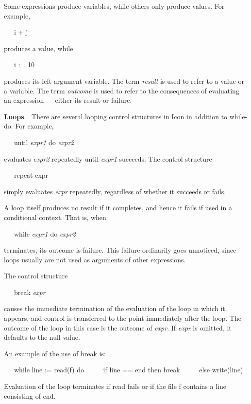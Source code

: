 Some expressions produce variables, while others only produce
values. For example,

{\ttfamily\mdseries
\ \ \ i + j}

\noindent produces a value, while

{\ttfamily\mdseries
\ \ \ i := 10}

\noindent produces its left-argument variable. The term
\textit{result} is used to refer to a value or a variable. The term
\textit{outcome }is used to refer to the consequences of evaluating an
expression --- either its result or failure.

\textbf{Loops}. \ There are several looping control structures in Icon in addition to while-do. For example,

{\ttfamily\mdseries
\ \ \ until \textit{expr1 }do \textit{expr2}}

\noindent evaluates \textit{expr2} repeatedly until \textit{expr1}
succeeds. The control structure

{\ttfamily\mdseries
\ \ \ repeat expr}

\noindent simply evaluates \textit{expr} repeatedly, regardless of
whether it succeeds or fails.

A loop itself produces no result if it completes, and hence it fails
if used in a conditional context. That is, when

{\ttfamily\mdseries
\ \ \ while \textit{expr1 }do \textit{expr2}}

\noindent terminates, its outcome is failure. This failure ordinarily
goes unnoticed, since loops usually are not used as arguments of other
expressions.

The control structure

{\ttfamily\mdseries
\ \ \ break \textit{expr}}

\noindent causes the immediate termination of the evaluation of the
loop in which it appears, and control is transferred to the point
immediately after the loop. The outcome of the loop in this case is
the outcome of \textit{expr}. If \textit{expr} is omitted, it defaults
to the null value.

An example of the use of break is:

{\ttfamily\mdseries
\ \ \ while line := read(f) do\newline
 \ \ \ \ \ if line == {\textquotedbl}end{\textquotedbl} then break\newline
 \ \ \ \ \ else write(line)}

Evaluation of the loop terminates if read fails or if the file f
contains a line consisting of {\textquotedbl}end{\textquotedbl}.

